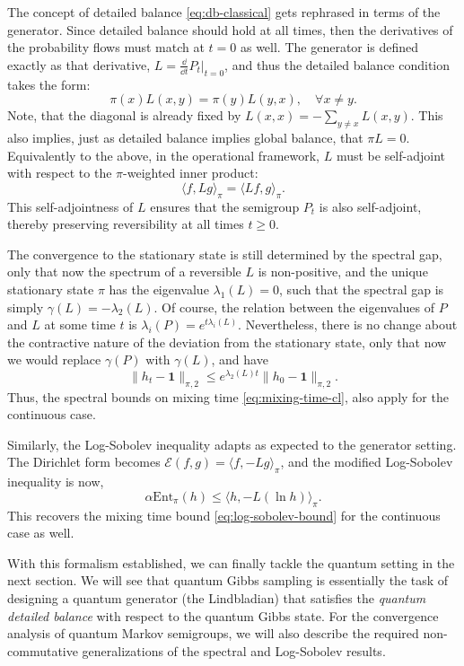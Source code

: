 The concept of detailed balance \eqref{eq:db-classical} gets rephrased in terms of the generator. Since detailed balance should hold at all times, then the derivatives of the probability flows must match at $t=0$ as well. The generator is defined exactly as that derivative, $L = \frac{\dd}{\dd t}P_t |_{t=0}$, and thus the detailed balance condition takes the form:
\begin{equation}
    \pi(x)L(x, y) = \pi(y) L(y, x), \quad \forall x\neq y.
\end{equation}
Note, that the diagonal is already fixed by $L(x, x) = - \sum_{y\neq x} L(x, y)$. This also implies, just as detailed balance implies global balance, that $\pi L = 0$. Equivalently to the above, in the operational framework, $L$ must be self-adjoint with respect to the $\pi$-weighted inner product:
\begin{equation}
    \langle f, Lg\rangle_\pi = \langle Lf, g\rangle_\pi.
\end{equation}
This self-adjointness of $L$ ensures that the semigroup $P_t$ is also self-adjoint, thereby preserving reversibility at all times $t\geq0$.

The convergence to the stationary state is still determined by the spectral gap, only that now the spectrum of a reversible $L$ is non-positive, and the unique stationary state $\pi$ has the eigenvalue $\lambda_1(L) = 0$, such that the spectral gap is simply $\gamma(L) = -\lambda_2(L)$. Of course, the relation between the eigenvalues of $P$ and $L$ at some time $t$ is $\lambda_i(P) = e^{t \lambda_i(L)}$. Nevertheless, there is no change about the contractive nature of the deviation from the stationary state, only that now we would replace $\gamma(P)$ with $\gamma(L)$, and have
$$\|h_t - \mathbf{1}\|_{\pi, 2} \leq e^{\lambda_2(L) t}\|h_0 - \mathbf{1}\|_{\pi, 2}.$$
Thus, the spectral bounds on mixing time \eqref{eq:mixing-time-cl}, also apply for the continuous case.

Similarly, the Log-Sobolev inequality adapts as expected to the generator setting. The Dirichlet form becomes $\mathcal{E}(f, g) = \langle f, -Lg \rangle_\pi$, and the modified Log-Sobolev inequality is now,
$$
    \alpha \text{Ent}_\pi(h) \leq \langle h, -L (\ln h) \rangle_\pi.
$$
This recovers the mixing time bound \eqref{eq:log-sobolev-bound} for the continuous case as well. 

With this formalism established, we can finally tackle the quantum setting in the next section. We will see that quantum Gibbs sampling is essentially the task of designing a quantum generator (the Lindbladian) that satisfies the \textit{quantum detailed balance} with respect to the quantum Gibbs state. For the convergence analysis of quantum Markov semigroups, we will also describe the required non-commutative generalizations of the spectral and Log-Sobolev results.


